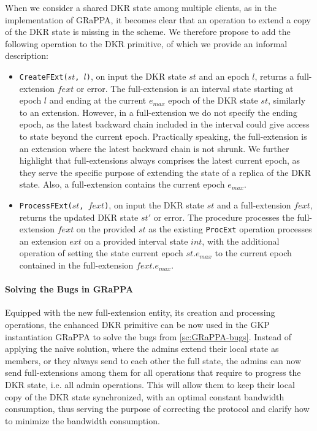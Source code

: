 When we consider a shared DKR state among multiple clients,
as in the implementation of GRaPPA, it becomes clear
that an operation to extend a copy of the DKR state is
missing in the scheme.
We therefore propose to add the following operation to the DKR
primitive, of which we provide an informal description:

\begin{itemize}
    \item \texttt{CreateFExt($st$, $l$)}, on input the DKR state $st$ and an epoch $l$,
    returns a full-extension $fext$ or error. The full-extension is an interval state
    starting at epoch $l$ and ending at the current $e_{max}$ epoch of the DKR state
    $st$, similarly to an extension. However, in a full-extension we do not 
    specify the ending epoch, as the latest backward chain included in the interval
    could give access to state beyond the current epoch. Practically speaking,
    the full-extension is an extension where the latest backward chain is not shrunk.
    We further highlight that full-extensions always comprises the latest current epoch,
    as they serve the specific purpose of extending the state of a replica of the DKR state.
    Also, a full-extension contains the current epoch $e_{max}$.

    \item \texttt{ProcessFExt($st$, $fext$)}, on input the DKR state $st$ and a full-extension $fext$,
    returns the updated DKR state $st'$ or error. The procedure processes the full-extension
    $fext$ on the provided $st$ as the existing \texttt{ProcExt} operation processes an extension $ext$
    on a provided interval state $int$, with the additional
    operation of setting the state current epoch $st.e_{max}$ to the current epoch contained
    in the full-extension $fext.e_{max}$.
    
\end{itemize}

\paragraph{Solving the Bugs in GRaPPA}
Equipped with the new full-extension entity, its creation and processing operations,
the enhanced DKR primitive can be now used in the GKP instantiation
GRaPPA to solve the bugs from \cref{sc:GRaPPA-bugs}.
Instead of applying the na\"ive solution, where the admins
extend their local state as members, or they always send to each
other the full state, the admins can now send full-extensions
among them for all operations that require to progress the DKR state,
i.e. all admin operations.
This will allow them to keep their local copy of
the DKR state synchronized, with an optimal constant bandwidth 
consumption, thus serving the purpose of correcting the 
protocol and clarify how to minimize the bandwidth consumption.

